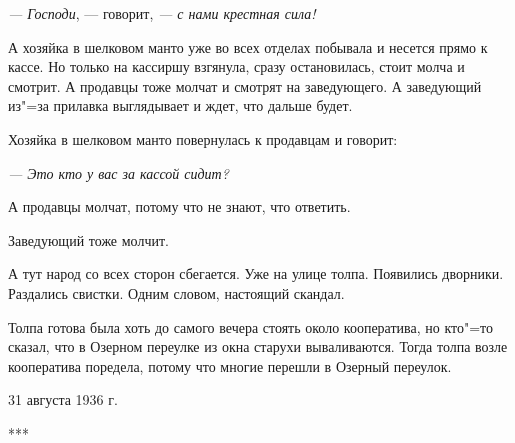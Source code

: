 \textit{--- Господи}, --- говорит, \textit{--- с нами крестная сила!}

А хозяйка в шелковом манто уже во всех отделах побывала и несется прямо к кассе. Но только на кассиршу взгянула, сразу остановилась, стоит молча и смотрит. А продавцы тоже молчат и смотрят на заведующего. А заведующий из"=за прилавка выглядывает и ждет, что дальше будет.

Хозяйка в шелковом манто повернулась к продавцам и говорит:

\textit{--- Это кто у вас за кассой сидит?}

А продавцы молчат, потому что не знают, что ответить.

Заведующий тоже молчит.

А тут народ со всех сторон сбегается. Уже на улице толпа. Появились дворники. Раздались свистки. Одним словом, настоящий скандал.

Толпа готова была хоть до самого вечера стоять около кооператива, но кто"=то сказал, что в Озерном переулке из окна старухи вываливаются. Тогда толпа возле кооператива поредела, потому что многие перешли в Озерный переулок.

\begin{flushright}
31 августа 1936 г.
\end{flushright}
\begin{center} 
***
\end{center}